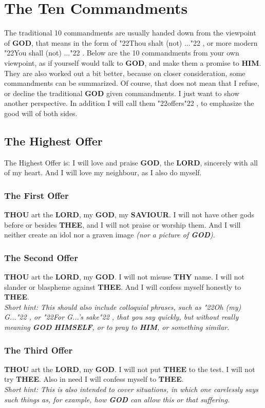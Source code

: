 \documentclass[10pt,a5paper]{article}
\newcommand{\God}[0]{\textbf{GOD}}
\newcommand{\Him}[0]{\textbf{HIM}}
\newcommand{\Himself}[0]{\textbf{HIMSELF}}
\newcommand{\Lord}[0]{\textbf{LORD}}
\newcommand{\Saviour}[0]{\textbf{SAVIOUR}}
\newcommand{\Thee}[0]{\textbf{THEE}}
\newcommand{\Thou}[0]{\textbf{THOU}}
\newcommand{\Thy}[0]{\textbf{THY}}
\newcommand{\q}[1]{\char"22{#1}\char"22 }
\begin{document}
	\newpage
	\section{The Ten Commandments}
		The traditional 10 commandments are usually handed down from the viewpoint of {\God},
		that means in the form of \q{Thou shalt (not) ...},
		or more modern \q{You shall (not) ...}.
		Below are the 10 commandments from your own viewpoint,
		as if yourself would talk to {\God},
		and make them a promise to {\Him}.
		They are also worked out a bit better,
		because on closer consideration,
		some commandments can be summarized.
		Of course,
		that does not mean that I refuse,
		or decline the traditional {\God} given commandments.
		I just want to show another perspective.
		In addition I will call them \q{offers},
		to emphasize the good will of both sides.
	
	\subsection{The Highest Offer}
		The Highest Offer is:
		I will love and praise {\God},
		the {\Lord},
		sincerely with all of my heart.
		And I will love my neighbour,
		as I also do myself.
		
	\subsubsection{The First Offer}
		{\Thou} art the {\Lord},
		my {\God},
		my {\Saviour}.
		I will not have other gods before or besides {\Thee},
		and I will not praise or worship them.
		And I will neither create an idol nor a graven image
		\textit{(nor a picture of {\God})}.
		
	\subsubsection{The Second Offer}
		{\Thou} art the {\Lord},
		my {\God}.
		I will not misuse {\Thy} name.
		I will not slander or blaspheme against {\Thee}.
		And I will confess myself honestly to {\Thee}.
		\\
		\textit{Short hint:
		This should also include colloquial phrases,
		such as \q{Oh (my) G...},
		or \q{For G...'s sake},
		that you say quickly,
		but without really meaning {\God} {\Himself},
		or to pray to {\Him},
		or something similar.}
			
	\subsubsection{The Third Offer}
		{\Thou} art the {\Lord},
		my {\God}.
		I will not put {\Thee} to the test.
		I will not try {\Thee}.
		Also in need I will confess myself to {\Thee}.
		\\
		\textit{Short hint:
		This is also intended to cover situations,
		in which one carelessly says such things as,
		for example,
		how {\God} can allow this or that suffering.}
		
\end{document}

